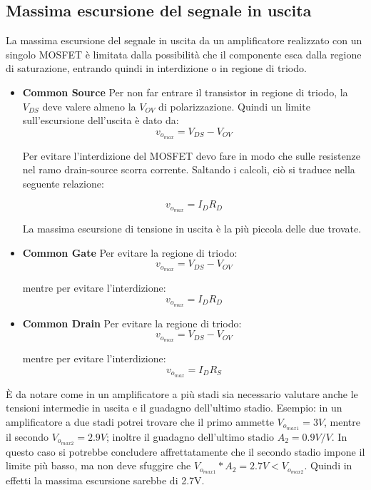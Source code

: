 \documentclass[a4paper,twocolumn,notitlepage]{book}
\begin{document}
		\subsection*{Massima escursione del segnale in uscita}
		La massima escursione del segnale in uscita da un amplificatore realizzato con un singolo MOSFET è limitata dalla possibilità che il componente esca dalla regione di saturazione, entrando quindi in interdizione o in regione di triodo.
		\begin{itemize}
			\item \textbf{Common Source} \newline
				Per non far entrare il transistor in regione di triodo, la $V_{DS}$ deve valere almeno la $V_{OV}$ di polarizzazione. Quindi un limite sull'escursione dell'uscita è dato da:
				\begin{equation}
					v_{o_{max}}=V_{DS}-V_{OV}
				\end{equation}				
				
				Per evitare l'interdizione del MOSFET devo fare in modo che sulle resistenze nel ramo drain-source scorra corrente. Saltando i calcoli, ciò si traduce nella seguente relazione:
				
				\begin{equation}
					v_{o_{max}}=I_D R_D
				\end{equation}
				
				La massima escursione di tensione in uscita è la più piccola delle due trovate.
			\item \textbf{Common Gate}  \newline
				Per evitare la regione di triodo:
				\begin{equation}
					v_{o_{max}}=V_{DS}-V_{OV}
				\end{equation}
				
				mentre per evitare l'interdizione:
				\begin{equation}
					v_{o_{max}}=I_D R_D
				\end{equation}
				
			\item \textbf{Common Drain}  \newline
				Per evitare la regione di triodo:
				\begin{equation}
					v_{o_{max}}=V_{DS}-V_{OV}
				\end{equation}
				
				mentre per evitare l'interdizione:
				\begin{equation}
					v_{o_{max}}=I_D R_S
				\end{equation}
		\end{itemize}
		È da notare come in un amplificatore a più stadi sia necessario valutare anche le tensioni intermedie in uscita e il guadagno dell'ultimo stadio. Esempio: in un amplificatore a due stadi potrei trovare che il primo ammette $V_{o_{max1}}=3V$, mentre il secondo $V_{o_{max2}}=2.9V$; inoltre il guadagno dell'ultimo stadio $A_{2}=0.9V/V$. In questo caso si potrebbe concludere affrettatamente che il secondo stadio impone il limite più basso, ma non deve sfuggire che $V_{o_{max1}}*A_{2}=2.7V < V_{o_{max2}}$. Quindi in effetti la massima escursione sarebbe di 2.7V.
\end{document}
